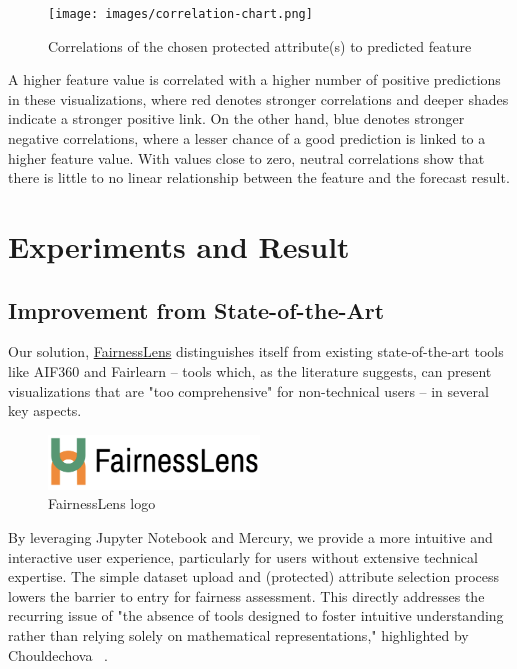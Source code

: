 \documentclass[runningheads]{llncs}
\begin{document}
\begin{figure}[H]
\centering
\texttt{[image: images/correlation-chart.png]}
\caption{Correlations of the chosen protected attribute(s) to predicted feature} \label{correlation-chart}
\end{figure}

A higher feature value is correlated with a higher number of positive predictions in these visualizations, where red denotes stronger correlations and deeper shades indicate a stronger positive link. On the other hand, blue denotes stronger negative correlations, where a lesser chance of a good prediction is linked to a higher feature value. With values close to zero, neutral correlations show that there is little to no linear relationship between the feature and the forecast result.

\section{Experiments and Result}
\subsection{Improvement from State-of-the-Art}
Our solution, \href{https://github.com/bence749/fairnessLens}{FairnessLens} distinguishes itself from existing state-of-the-art tools like AIF360 and Fairlearn – tools which, as the literature suggests, can present visualizations that are "too comprehensive" for non-technical users – in several key aspects.\\

\begin{figure}[H]
\centering
\includegraphics[width=0.5\textwidth]{images/fairnesslens-logo.png}
\caption{FairnessLens logo} \label{fairnesslens-logo}
\end{figure}

By leveraging Jupyter Notebook and Mercury, we provide a more intuitive and interactive user experience, particularly for users without extensive technical expertise. The simple dataset upload and (protected) attribute selection process lowers the barrier to entry for fairness assessment. This directly addresses the recurring issue of "the absence of tools designed to foster intuitive understanding rather than relying solely on mathematical representations," highlighted by Chouldechova ~\cite{chouldechova2017}.\\
\end{document}

